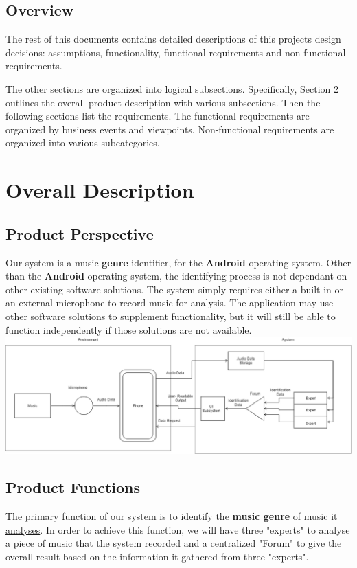 \documentclass[]{article}
\begin{document}
\subsection{Overview}
\label{sub:overview}
The rest of this documents contains detailed descriptions of this projects design decisions: assumptions, functionality, functional requirements and non-functional requirements.

The other sections are organized into logical subsections. Specifically, Section 2 outlines the overall product description with various subsections. Then the following sections list the requirements. The functional requirements are organized by business events and viewpoints. Non-functional requirements are organized into various subcategories.

\newpage
\section{Overall Description}
\label{sec:overall_description}
\subsection{Product Perspective}
\label{sub:product_perspective}
Our system is a music \textbf{genre} identifier, for the \textbf{Android} operating system. Other than the \textbf{Android} operating system, the identifying process is not dependant on other existing software solutions. The system simply requires either a built-in or an external microphone to record music for analysis. The application may use other software solutions to supplement functionality, but it will still be able to function independently if those solutions are not available.
\\
\includegraphics[scale=0.4]{Diag1}

\subsection{Product Functions}
\label{sub:product_functions}
The primary function of our system is to \underline{identify the \textbf{music genre} of music it analyses}. In order to achieve this function, we will have three "experts" to analyse a piece of music that the system recorded and a centralized "Forum" to give the overall result based on the information it gathered from three "experts".
\end{document}
